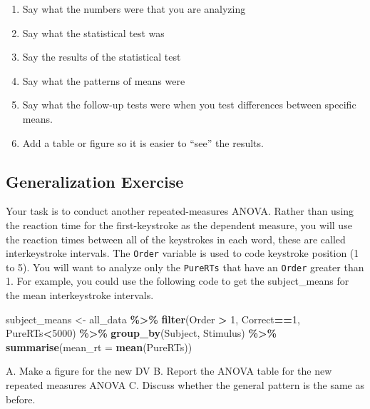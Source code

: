 \documentclass[
]{book}
\newenvironment{Shaded}{\begin{snugshade}}{\end{snugshade}}
\newcommand{\AttributeTok}[1]{\textcolor[rgb]{0.13,0.29,0.53}{#1}}
\newcommand{\DecValTok}[1]{\textcolor[rgb]{0.00,0.00,0.81}{#1}}
\newcommand{\FunctionTok}[1]{\textcolor[rgb]{0.13,0.29,0.53}{\textbf{#1}}}
\newcommand{\NormalTok}[1]{#1}
\newcommand{\OtherTok}[1]{\textcolor[rgb]{0.56,0.35,0.01}{#1}}
\newcommand{\SpecialCharTok}[1]{\textcolor[rgb]{0.81,0.36,0.00}{\textbf{#1}}}
\providecommand{\tightlist}{%
  \setlength{\itemsep}{0pt}\setlength{\parskip}{0pt}}
\begin{document}
\begin{enumerate}
\def\labelenumi{\arabic{enumi}.}
\tightlist
\item
  Say what the numbers were that you are analyzing
\item
  Say what the statistical test was
\item
  Say the results of the statistical test
\item
  Say what the patterns of means were
\item
  Say what the follow-up tests were when you test differences between specific means.
\item
  Add a table or figure so it is easier to ``see'' the results.
\end{enumerate}

\hypertarget{generalization-exercise-8}{%
\subsection{Generalization Exercise}\label{generalization-exercise-8}}

Your task is to conduct another repeated-measures ANOVA. Rather than using the reaction time for the first-keystroke as the dependent measure, you will use the reaction times between all of the keystrokes in each word, these are called interkeystroke intervals. The \texttt{Order} variable is used to code keystroke position (1 to 5). You will want to analyze only the \texttt{PureRTs} that have an \texttt{Order} greater than 1. For example, you could use the following code to get the subject\_means for the mean interkeystroke intervals.

\begin{Shaded}
\begin{Highlighting}[]
\NormalTok{subject\_means }\OtherTok{\textless{}{-}}\NormalTok{ all\_data }\SpecialCharTok{\%\textgreater{}\%}
                 \FunctionTok{filter}\NormalTok{(Order }\SpecialCharTok{\textgreater{}} \DecValTok{1}\NormalTok{, Correct}\SpecialCharTok{==}\DecValTok{1}\NormalTok{, PureRTs}\SpecialCharTok{\textless{}}\DecValTok{5000}\NormalTok{) }\SpecialCharTok{\%\textgreater{}\%}
                 \FunctionTok{group\_by}\NormalTok{(Subject, Stimulus) }\SpecialCharTok{\%\textgreater{}\%}
                 \FunctionTok{summarise}\NormalTok{(}\AttributeTok{mean\_rt =} \FunctionTok{mean}\NormalTok{(PureRTs))}
\end{Highlighting}
\end{Shaded}

A. Make a figure for the new DV B. Report the ANOVA table for the new repeated measures ANOVA C. Discuss whether the general pattern is the same as before.
\end{document}
